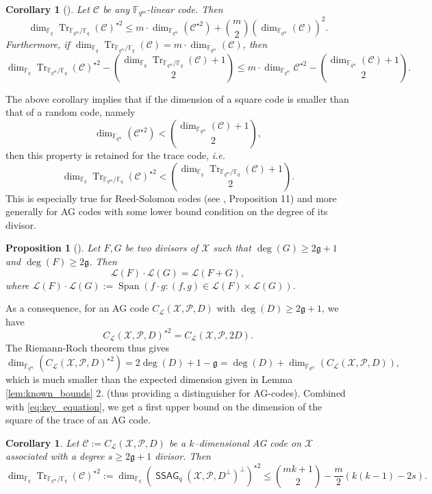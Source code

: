 \documentclass[a4paper]{article}
\newtheorem{proposition}[thm]{Proposition}
\newtheorem{coro}[thm]{Corollary}
\theoremstyle{definition}
\theoremstyle{remark}
\newcommand{\calP}{\mathcal{P}}
\newcommand{\calL}{\mathcal{L}}
\newcommand{\calC}{\mathcal{C}}
\newcommand{\calX}{\mathcal{X}}
\newcommand{\fqm}{\mathbb{F}_{q^m}}
\newcommand{\fq}{\mathbb{F}_{q}}
\newcommand{\Tr}[1]{\operatorname{Tr}_{\mathbb{F}_{q^m}/\fq}\left(#1\right)}
\newcommand{\Span}[1]{\operatorname{Span}\left(#1\right)}
\newcommand{\ssag}[1]{\operatorname{\mathsf{SSAG}}_{q}\left(#1\right)}
\begin{document}
\begin{coro} [{\cite[Corollary~16]{MT21}}]\label{coro:first_bound_square_of_trace}
 Let $\calC$ be any $\fqm$-linear code. Then 
 \begin{equation} \label{eq:mumford_bound}
  \dim_{\fq}\Tr{\calC}^{\star2} \leq m \cdot \dim_{\fqm}(\calC^{\star 2}) + \binom{m}{2} (\dim_{\fqm}(\calC))^2.
 \end{equation}
 Furthermore, if $\dim_{\fq} \Tr{\calC} = m \cdot \dim_{\fqm}(\calC)$, then 
 \[\dim_{\fq} \Tr{\calC}^{\star2} - \binom{\dim_{\fq} \Tr{\calC}+1}{2} \leq m \cdot \dim_{\fqm} \calC^{\star 2} - \binom{\dim_{\fqm} (\calC)+1}{2}.\]
 
 
\end{coro}
The above corollary implies that if the dimension of a square code is smaller than that of a random code, namely
\[ \dim_{\fqm} (\calC^{\star 2}) < \binom{\dim_{\fqm} (\calC)+1}{2},\]
then this property is retained for the trace code, \emph{i.e.}
\[\dim_{\fq} \Tr{\calC}^{\star 2} < \binom{\dim_{\fq} \Tr{\calC}+1}{2}.\]
This is especially true for Reed-Solomon codes (see \cite{MT21}, Proposition 11) and more generally for AG codes with some lower bound condition on the degree of its divisor.


\begin{proposition} [{\cite[Theorem~6]{Mum70}}] \label{prop:mumford_result}
 Let $F,G$ be two divisors of $\calX$ such that $\deg(G) \geq 2\mathfrak{g}+1$ and $\deg(F) \geq 2\mathfrak{g}$. Then
 \[ \calL(F) \cdot \calL(G) = \calL(F+G),\]
 where $\calL(F) \cdot \calL(G) := \Span{ f \cdot g : (f,g) \in \calL(F) \times \calL(G)}$.
\end{proposition}
As a consequence, for an AG code  $C_{\calL}(\calX,\mathcal{P},D)$ with $\deg(D) \geq 2\mathfrak{g}+1$, we have
\[ C_{\calL}(\calX,\mathcal{P},D)^{\star2} = C_{\calL}(\calX,\calP,2D).\]
The Riemann-Roch theorem thus gives
\[ \dim_{\fqm}(C_{\calL}(\calX,\mathcal{P},D)^{\star2}) = 2\deg(D)+1-\mathfrak{g}= \deg(D) + \dim_{\fqm}(C_{\calL}(\calX,\mathcal{P},D)), \]
which is much smaller than the expected dimension given in Lemma \ref{lem:known_bounds} 2. (thus providing a distinguisher for AG-codes). Combined with \eqref{eq:key_equation}, we get a first upper bound on the dimension of the square of the trace of an AG code.

\begin{coro} \label{coro:1st_bound_mumford}
 Let $\mathcal{C} := C_{\calL}(\calX,\mathcal{P},D)$ be a $k$--dimensional AG code on $\calX$ associated with a degree $s \geq 2\mathfrak{g}+1$ divisor. Then
 \[ \dim_{\fq}\Tr{\calC}^{\star2} := \dim_{\fq} (\ssag{\calX,\calP,D^{\perp}}^{\perp})^{\star2}  \leq \binom{mk+1}{2} - \dfrac{m}{2} (k(k-1)-2s).\]
\end{coro}
\end{document}
